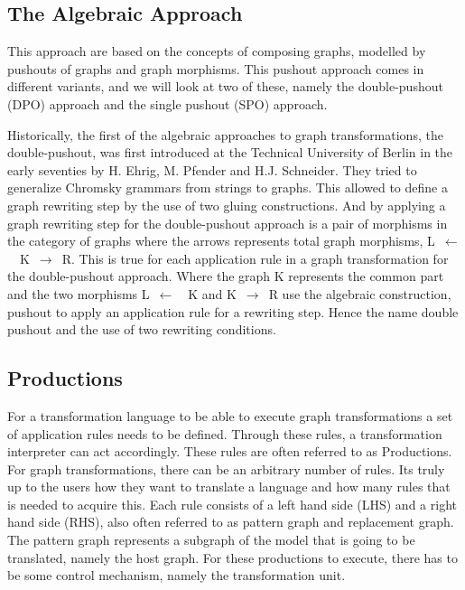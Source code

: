 \subsection{The Algebraic Approach}
\noindent This approach are based on the concepts of composing graphs, modelled
by pushouts of graphs and graph morphisms. This pushout approach comes in
different variants, and we will look at two of these, namely the
double-pushout (DPO) approach and the single pushout (SPO)
approach\cite{Loewe1997,Ehrig1997}.

\indent Historically, the first of the algebraic approaches to graph
transformations, the double-pushout, was first introduced at the Technical
University of Berlin in the early seventies by H. Ehrig, M. Pfender and H.J.
Schneider\cite{INSPEC:606170}. They tried to generalize Chromsky grammars from
strings to graphs. This allowed to define a graph rewriting step by the use of
two gluing constructions. And by applying a graph rewriting step for the
double-pushout approach is a pair of morphisms in the category of graphs where
the arrows represents total graph morphisms, \linebreak\mbox{L $\longleftarrow$
\ K $\longrightarrow$ R}. This is true for each application rule in a graph
transformation for the double-pushout approach. Where the graph K represents the
common part and the two morphisms \mbox{L $\longleftarrow$ \ K} and \mbox{K
$\longrightarrow$ R} use the algebraic construction, pushout to apply an
application rule for a rewriting step. Hence the name double pushout and the use
of two rewriting conditions.

\subsection{Productions}
\noindent For a transformation language to be able to execute graph
transformations a set of application rules needs to be defined. Through these
rules, a transformation interpreter can act accordingly. These rules are often
referred to as Productions. For graph transformations, there can be an arbitrary
number of rules. Its truly up to the users how they want to translate a
language and how many rules that is needed to acquire this. Each rule consists
of a left hand side (LHS) and a right hand side (RHS), also often referred to as
pattern graph and replacement graph. The pattern graph represents a subgraph of
the model that is going to be translated, namely the host graph. For these
productions to execute, there has to be some control mechanism, namely the
transformation unit.


